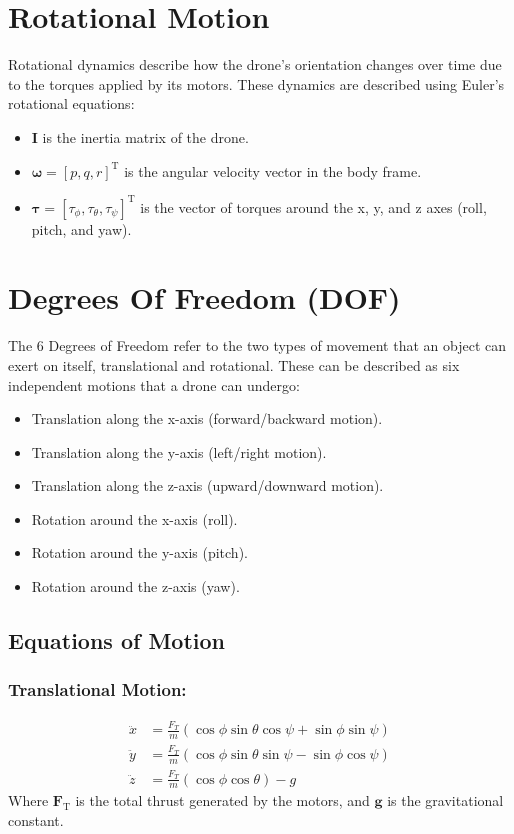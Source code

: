 \documentclass[a4paper,12pt]{report}
\begin{document}
\section{Rotational Motion}
Rotational dynamics describe how the drone's orientation changes over time due to the torques applied by its motors. These dynamics are described using Euler’s rotational equations:
\begin{itemize}
    \item \(\mathbf{I}\) is the inertia matrix of the drone.
    \item \(\boldsymbol{\omega} = [p, q, r]^\text{T}\) is the angular velocity vector in the body frame.
    \item \(\boldsymbol{\tau} = [\tau_{\phi}, \tau_{\theta}, \tau_{\psi}]^\text{T}\) is the vector of torques around the x, y, and z axes (roll, pitch, and yaw).
\end{itemize}


\section{Degrees Of Freedom (DOF)}
The 6 Degrees of Freedom refer to the two types of movement that an object can exert on itself, translational and rotational. 
These can be described as six independent motions that a drone can undergo:
\begin{itemize}
    \item Translation along the x-axis (forward/backward motion).
    \item Translation along the y-axis (left/right motion).
    \item Translation along the z-axis (upward/downward motion).
    \item Rotation around the x-axis (roll).
    \item Rotation around the y-axis (pitch).
    \item Rotation around the z-axis (yaw).
\end{itemize}

\subsection{Equations of Motion}

\subsubsection{Translational Motion:}
\begin{align*}
\ddot{x} &= \frac{F_T}{m} (\cos{\phi} \sin{\theta} \cos{\psi} + \sin{\phi} \sin{\psi}) \\
\ddot{y} &= \frac{F_T}{m} (\cos{\phi} \sin{\theta} \sin{\psi} - \sin{\phi} \cos{\psi}) \\
\ddot{z} &= \frac{F_T}{m} (\cos{\phi} \cos{\theta}) - g
\end{align*}
Where \(\mathbf{F}_{\text{T}}\) is the total thrust generated by the motors, and \(\mathbf{g}\) is the gravitational constant.
\end{document}

